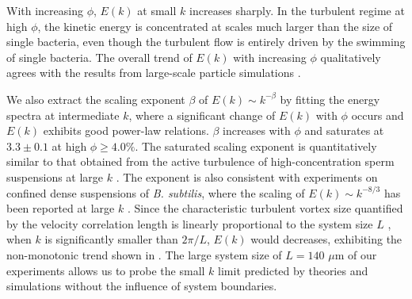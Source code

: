 \documentclass[twocolumn,aps,prx,amsmath,amssymb,longbibliography]{revtex4-2}
\begin{document}
With increasing $\phi$, $E(k)$ at small $k$ increases sharply. In the turbulent regime at high $\phi$, the kinetic energy is concentrated at scales much larger than the size of single bacteria, even though the turbulent flow is entirely driven by the swimming of single bacteria. The overall trend of $E(k)$ with increasing $\phi$ qualitatively agrees with the results from large-scale particle simulations \cite{Saintillan2012,Bardfalvy2019}.

We also extract the scaling exponent $\beta$ of $E(k) \sim k^{-\beta}$ by fitting the energy spectra at intermediate $k$, where a significant change of $E(k)$ with $\phi$ occurs and $E(k)$ exhibits good power-law relations. $\beta$ increases with $\phi$ and saturates at $3.3 \pm 0.1$ at high $\phi \geq 4.0\%$. The saturated scaling exponent is quantitatively similar to that obtained from the active turbulence of high-concentration sperm suspensions at large $k$ \cite{Creppy2015}.
The exponent is also consistent with experiments on confined dense suspensions of \textit{B. subtilis}, where the scaling of $E(k) \sim k^{-8/3}$ has been reported at large $k$ \cite{Wensink2012}.
Since the characteristic turbulent vortex size quantified by the velocity correlation length is linearly proportional to the system size $L$ \cite{Guo2018}, when $k$ is significantly smaller than $2\pi/L$, $E(k)$ would decreases, exhibiting the non-monotonic trend shown in \cite{Wensink2012}. The large system size of $L = 140$ $\mu$m of our experiments allows us to probe the small $k$ limit predicted by theories and simulations without the influence of system boundaries.
\end{document}
